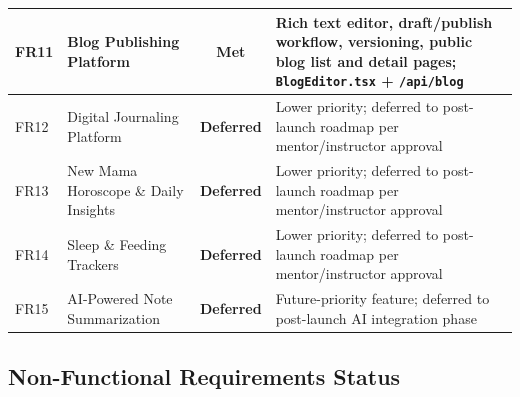 \documentclass[12pt,letterpaper]{article}
\begin{document}
{\begin{longtable}{|>{\raggedright\arraybackslash}p{1cm}|>{\raggedright\arraybackslash}p{3.2cm}|c|>{\raggedright\arraybackslash}p{6.5cm}|}
\hline
FR11 & Blog Publishing Platform & \textbf{Met} & Rich text editor, draft/publish workflow, versioning, public blog list and detail pages; \texttt{BlogEditor.tsx} + \texttt{/api/blog} \\
\hline
\rowcolor{TableRowAlt}
FR12 & Digital Journaling Platform & \textbf{Deferred} & Lower priority; deferred to post-launch roadmap per mentor/instructor approval \\
\hline
FR13 & New Mama Horoscope \& Daily Insights & \textbf{Deferred} & Lower priority; deferred to post-launch roadmap per mentor/instructor approval \\
\hline
\rowcolor{TableRowAlt}
FR14 & Sleep \& Feeding Trackers & \textbf{Deferred} & Lower priority; deferred to post-launch roadmap per mentor/instructor approval \\
\hline
FR15 & AI-Powered Note Summarization & \textbf{Deferred} & Future-priority feature; deferred to post-launch AI integration phase \\
\hline
\end{longtable}
}

\subsection{Non-Functional Requirements Status}
\end{document}
